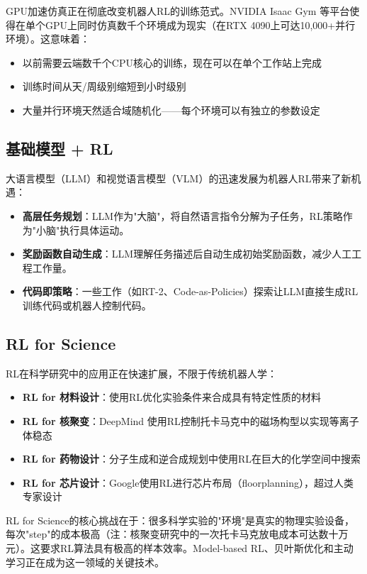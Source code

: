 GPU加速仿真正在彻底改变机器人RL的训练范式。NVIDIA Isaac Gym 等平台使得在单个GPU上同时仿真数千个环境成为现实（在RTX 4090上可达10,000+并行环境）。这意味着：

\begin{itemize}
    \item 以前需要云端数千个CPU核心的训练，现在可以在单个工作站上完成
    \item 训练时间从天/周级别缩短到小时级别
    \item 大量并行环境天然适合域随机化——每个环境可以有独立的参数设定
\end{itemize}

\subsection{基础模型 + RL}

大语言模型（LLM）和视觉语言模型（VLM）的迅速发展为机器人RL带来了新机遇：

\begin{itemize}
    \item \textbf{高层任务规划}：LLM作为"大脑"，将自然语言指令分解为子任务，RL策略作为"小脑"执行具体运动。
    \item \textbf{奖励函数自动生成}：LLM理解任务描述后自动生成初始奖励函数，减少人工工程工作量。
    \item \textbf{代码即策略}：一些工作（如RT-2、Code-as-Policies）探索让LLM直接生成RL训练代码或机器人控制代码。
\end{itemize}

\subsection{RL for Science}

RL在科学研究中的应用正在快速扩展，不限于传统机器人学：

\begin{itemize}
    \item \textbf{RL for 材料设计}：使用RL优化实验条件来合成具有特定性质的材料
    \item \textbf{RL for 核聚变}：DeepMind 使用RL控制托卡马克中的磁场构型以实现等离子体稳态
    \item \textbf{RL for 药物设计}：分子生成和逆合成规划中使用RL在巨大的化学空间中搜索
    \item \textbf{RL for 芯片设计}：Google使用RL进行芯片布局（floorplanning），超过人类专家设计
\end{itemize}

\begin{remark}
RL for Science的核心挑战在于：很多科学实验的"环境"是真实的物理实验设备，每次"step"的成本极高（注：核聚变研究中的一次托卡马克放电成本可达数十万元）。这要求RL算法具有极高的样本效率。Model-based RL、贝叶斯优化和主动学习正在成为这一领域的关键技术。
\end{remark}

